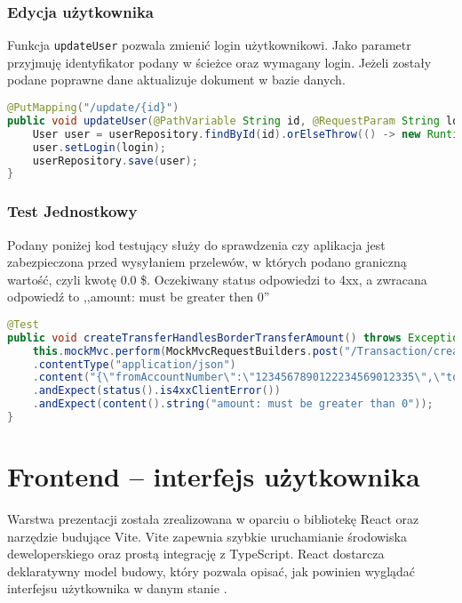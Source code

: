 \subsubsection*{Edycja użytkownika}
Funkcja \texttt{updateUser} pozwala zmienić login użytkownikowi. Jako parametr przyjmuję identyfikator podany w ścieżce oraz wymagany login. Jeżeli zostały podane poprawne dane aktualizuje dokument w bazie danych.
\begin{lstlisting}[language={Java}, caption={Edycja użytkownika}, label={lst:java-update}]
@PutMapping("/update/{id}")
public void updateUser(@PathVariable String id, @RequestParam String login) {
	User user = userRepository.findById(id).orElseThrow(() -> new RuntimeException("User not found"));
	user.setLogin(login);
	userRepository.save(user);
}
\end{lstlisting}
\subsubsection*{Test Jednostkowy}
Podany poniżej kod testujący służy do sprawdzenia czy aplikacja jest zabezpieczona przed wysyłaniem przelewów, w których podano graniczną wartość, czyli kwotę 0.0 \$. Oczekiwany status odpowiedzi to 4xx, a zwracana odpowiedź to ,,amount: must be greater then 0''
\begin{lstlisting}[language={Java}, caption={Przykładowy test}, label={lst:java-UnitTest}]
@Test
public void createTransferHandlesBorderTransferAmount() throws Exception {
	this.mockMvc.perform(MockMvcRequestBuilders.post("/Transaction/create/transfer")
	.contentType("application/json")
	.content("{\"fromAccountNumber\":\"1234567890122234569012335\",\"toAccountNumber\":\"1234567890122234569012335\",\"amount\":0.0}"))
	.andExpect(status().is4xxClientError())
	.andExpect(content().string("amount: must be greater than 0"));
}
\end{lstlisting}
\section{Frontend – interfejs użytkownika}
Warstwa prezentacji została zrealizowana w oparciu o bibliotekę React oraz narzędzie budujące Vite. Vite zapewnia szybkie uruchamianie środowiska deweloperskiego oraz prostą integrację z TypeScript. React dostarcza deklaratywny model budowy, który pozwala opisać, jak powinien wyglądać interfejsu użytkownika w danym stanie \cite{Declarative}. 
